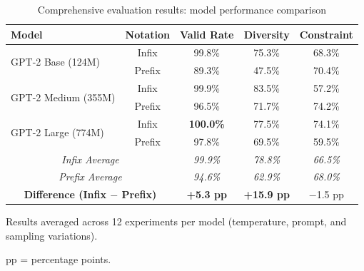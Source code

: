 
\begin{table}[htbp]
\centering
\caption{Comprehensive evaluation results: model performance comparison}
\label{tab:main_results}
\begin{tabular}{@{}lcccc@{}}
\toprule
\textbf{Model} & \textbf{Notation} & \textbf{Valid Rate} & \textbf{Diversity} & \textbf{Constraint} \\
\midrule
\multirow{2}{*}{GPT-2 Base (124M)}
    & Infix  & 99.8\% & 75.3\% & 68.3\% \\
    & Prefix & 89.3\% & 47.5\% & 70.4\% \\
\midrule
\multirow{2}{*}{GPT-2 Medium (355M)}
    & Infix  & 99.9\% & 83.5\% & 57.2\% \\
    & Prefix & 96.5\% & 71.7\% & 74.2\% \\
\midrule
\multirow{2}{*}{GPT-2 Large (774M)}
    & Infix  & \textbf{100.0\%} & 77.5\% & 74.1\% \\
    & Prefix & 97.8\% & 69.5\% & 59.5\% \\
\midrule
\multicolumn{2}{c}{\textit{Infix Average}} & \textit{99.9\%} & \textit{78.8\%} & \textit{66.5\%} \\
\multicolumn{2}{c}{\textit{Prefix Average}} & \textit{94.6\%} & \textit{62.9\%} & \textit{68.0\%} \\
\midrule
\multicolumn{2}{c}{\textbf{Difference (Infix $-$ Prefix)}} & \textbf{+5.3 pp} & \textbf{+15.9 pp} & $-$1.5 pp \\
\bottomrule
\end{tabular}
\begin{tablenotes}
\small
\item Results averaged across 12 experiments per model (temperature, prompt, and sampling variations).
\item pp = percentage points.
\end{tablenotes}
\end{table}

